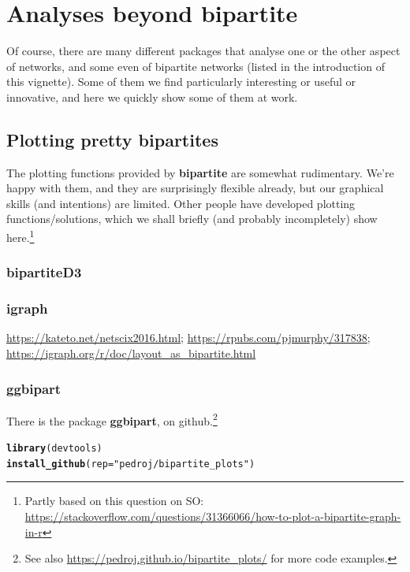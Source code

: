 \documentclass[a4paper, 11pt]{article}\usepackage[]{graphicx}\usepackage[]{color}
\makeatletter
\newcommand{\hlstr}[1]{\textcolor[rgb]{0.192,0.494,0.8}{#1}}%
\newcommand{\hlstd}[1]{\textcolor[rgb]{0.345,0.345,0.345}{#1}}%
\newcommand{\hlkwc}[1]{\textcolor[rgb]{0.333,0.667,0.333}{#1}}%
\newcommand{\hlkwd}[1]{\textcolor[rgb]{0.737,0.353,0.396}{\textbf{#1}}}%
\newenvironment{kframe}{%
 \def\at@end@of@kframe{}%
 \ifinner\ifhmode%
  \def\at@end@of@kframe{\end{minipage}}%
  \begin{minipage}{\columnwidth}%
 \fi\fi%
 \def\FrameCommand##1{\hskip\@totalleftmargin \hskip-\fboxsep
 \colorbox{shadecolor}{##1}\hskip-\fboxsep
     \hskip-\linewidth \hskip-\@totalleftmargin \hskip\columnwidth}%
 \MakeFramed {\advance\hsize-\width
   \@totalleftmargin\z@ \linewidth\hsize
   \@setminipage}}%
 {\par\unskip\endMakeFramed%
 \at@end@of@kframe}
\newenvironment{knitrout}{}{} %
\newcommand{\package}[1]{\textbf{#1}}
\makeatother
\begin{document}
\section{Analyses beyond \package{bipartite}}%
Of course, there are many different packages that analyse one or the other aspect of networks, and some even of bipartite networks (listed in the introduction of this vignette). Some of them we find particularly interesting or useful or innovative, and here we quickly show some of them at work.

\subsection{Plotting pretty bipartites}
The plotting functions provided by \package{bipartite} are somewhat rudimentary. We're happy with them, and they are surprisingly flexible already, but our graphical skills (and intentions) are limited. Other people have developed plotting functions/solutions, which we shall briefly (and probably incompletely) show here.\footnote{Partly based on this question on SO: \url{https://stackoverflow.com/questions/31366066/how-to-plot-a-bipartite-graph-in-r}}

\subsubsection{\package{bipartiteD3}}

\subsubsection{\package{igraph}}
\url{https://kateto.net/netscix2016.html}; \url{https://rpubs.com/pjmurphy/317838}; \url{https://igraph.org/r/doc/layout_as_bipartite.html}

\subsubsection{\package{ggbipart}}
There is the package \package{ggbipart}, on github.\footnote{See also \url{https://pedroj.github.io/bipartite_plots/} for more code examples.}
\begin{knitrout}
\color{fgcolor}\begin{kframe}
\begin{alltt}
\hlkwd{library}\hlstd{(devtools)}
\hlkwd{install_github}\hlstd{(}\hlkwc{rep}\hlstd{=}\hlstr{"pedroj/bipartite_plots"}\hlstd{)}
\end{alltt}
\end{kframe}
\end{knitrout}
\end{document}
